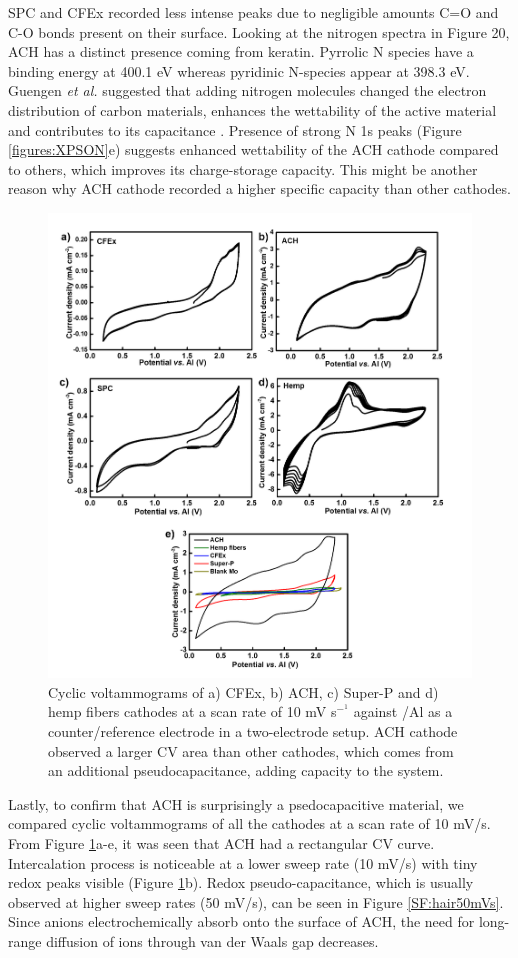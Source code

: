 \documentclass{article}
\begin{document}
SPC and CFEx recorded less intense peaks due to negligible amounts C=O and C-O bonds present on their surface.
Looking at the nitrogen spectra in Figure 20, ACH has a distinct presence coming from keratin. Pyrrolic N species have a binding energy at 400.1 eV whereas pyridinic N-species appear at 398.3 eV. Guengen \textit{et al.} suggested that adding nitrogen molecules changed the electron distribution of carbon materials, enhances the wettability of the active material and  contributes to its capacitance \cite{gueguen_xps_2016}. Presence of strong N 1s peaks (Figure \ref{figures:XPSON}e) suggests enhanced wettability of the ACH cathode compared to others, which improves its charge-storage capacity. This might be another reason why ACH cathode recorded a higher specific capacity than other cathodes. 
 \begin{figure}[tbh!]
  \centering
  \includegraphics[width=\textwidth]{figures/CV}
    \caption{Cyclic voltammograms of a) CFEx, b) ACH, c) Super-P and d) hemp fibers cathodes at a scan rate of 10 mV s$^-^1$ against /Al as a counter/reference electrode in a two-electrode setup. ACH cathode observed a larger CV area than other cathodes, which comes from an additional pseudocapacitance, adding capacity to the system.}
  \label{figures:CV}
\end{figure}
Lastly, to confirm that ACH is surprisingly a psedocapacitive material, we compared cyclic voltammograms of all the cathodes at a scan rate of 10 mV/s. From Figure \ref{figures:CV}a-e, it was seen that ACH had a rectangular CV curve. Intercalation process is noticeable at a lower sweep rate (10 mV/s) with tiny redox peaks visible (Figure \ref{figures:CV}b). Redox pseudo-capacitance, which is usually observed at higher sweep rates (50 mV/s), can be seen in Figure \ref{SF:hair50mVs}. Since  anions electrochemically absorb onto the surface of ACH, the  need for long-range diffusion of ions through van der Waals gap decreases. 
\end{document}
